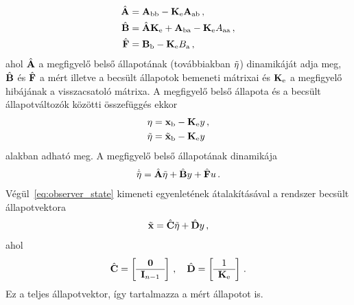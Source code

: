 \begin{align}\label{eq:observer_params}
    \begin{split}
    \hat{\mathbf{A}} &= \mathbf{A}_{\mathrm{bb}} - \mathbf{K}_{\mathrm{e}} \mathbf{A}_{\mathrm{ab}}\,,\\
    \hat{\mathbf{B}} &= \hat{\mathbf{A}} \mathbf{K}_{\mathrm{e}} + \mathbf{A}_{\mathrm{ba}} - \mathbf{K}_{\mathrm{e}} A_{\mathrm{aa}}\,,\\
    \hat{\mathbf{F}} &= \mathbf{B}_{\mathrm{b}} - \mathbf{K}_{\mathrm{e}} B_{\mathrm{a}}\,,
    \end{split}
\end{align}
ahol $\hat{\mathbf{A}}$ a megfigyelő belső állapotának (továbbiakban $\tilde{\mathbf{\eta}}$) 
dinamikáját adja meg, $\hat{\mathbf{B}}$ és $\hat{\mathbf{F}}$ a mért illetve a becsült állapotok 
bemeneti mátrixai és $\mathbf{K}_{\mathrm{e}}$ a megfigyelő hibájának a visszacsatoló mátrixa. 
A megfigyelő belső állapota és a becsült állapotváltozók közötti összefüggés ekkor
\begin{align}
    \begin{split}
    \mathbf{\eta} &= \mathbf{x}_{\mathrm{b}} - \mathbf{K}_{\mathrm{e}} y\,,\\
    \tilde{\mathbf{\eta}} &= \tilde{\mathbf{x}}_{\mathrm{b}} - \mathbf{K}_{\mathrm{e}} y
    \end{split}
\end{align}
alakban adható meg. A megfigyelő belső állapotának dinamikája
\begin{align}
    \begin{split}
    \dot{\tilde{\mathbf{\eta}}} = \hat{\mathbf{A}} \tilde{\mathbf{\eta}} + \hat{\mathbf{B}} y + \hat{\mathbf{F}} u\,.
    \end{split}
\end{align}
Végül~\eqref{eq:observer_state} kimeneti egyenletének átalakításával a rendszer becsült állapotvektora
\begin{align}
    \tilde{\mathbf{x}} = \hat{\mathbf{C}} \tilde{\mathbf{\eta}} + \hat{\mathbf{D}} y\,,
\end{align}
ahol
\begin{align}
    \hat{\mathbf{C}} = 
    \left[\begin{array}{c}
        \mathbf{0} \\ \hline
        \mathbf{I}_{n-1}
    \end{array}\right]\,,
    \quad
    \hat{\mathbf{D}} = 
    \left[\begin{array}{c}
        1 \\ \hline
        \mathbf{K}_{\mathrm{e}}
    \end{array}\right]\,.
\end{align}
Ez a teljes állapotvektor, így tartalmazza a mért állapotot is.